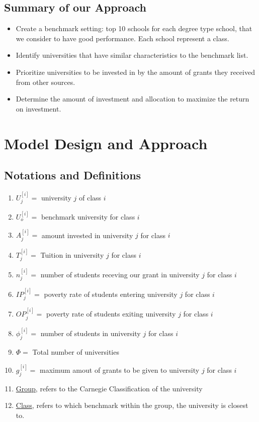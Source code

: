 \documentclass[12pt]{scrartcl}
\begin{document}
	\subsection{Summary of our Approach}
		\begin{itemize}
		\item Create a benchmark setting: top 10 schools for each degree type school, that we consider to have good performance. Each school represent a class.  
		\item Identify universities that have similar characteristics to the benchmark list. 
		\item Prioritize universities to be invested in by the amount of grants they received from other sources.
		\item Determine the amount of investment and allocation to maximize the return on investment. 
		\end{itemize}
				 
\section{Model Design and Approach}
	\subsection{Notations and Definitions}
	\begin{enumerate}
		\item $U_j^{[i]} = $ university $j$ of class $i$
		\item $U_o^{[i]} = $ benchmark university for class $i$
		\item $A_j^{[i]} = $ amount invested in university $j$ for class $i$
		\item $T_j^{[i]} = $ Tuition in university $j$ for class $i$
		\item $n_j^{[i]} = $ number of students receving our grant in university $j$ for class $i$
		\item $IP_j^{[i]} = $ poverty rate of students entering university $j$ for class $i$
		\item $OP_j^{[i]} = $ poverty rate of students exiting university $j$ for class $i$
		\item $\phi_j^{[i]} = $ number of students in university $j$ for class $i$
		\item $\Phi = $ Total number of universities
		\item $g_j^{[i]} = $ maximum amout of grants to be given to university $j$ for class $i$
		\item \underline{Group}, refers to the Carnegie Classification of the university
		\item \underline{Class}, refers to which benchmark within the group, the university is closest to.
	\end{enumerate}
	
\end{document}
